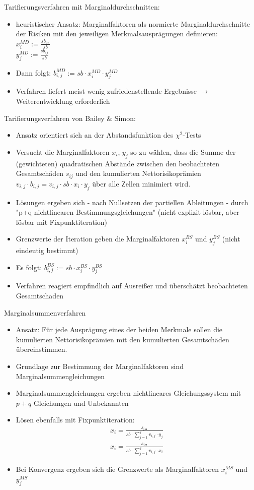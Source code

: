 \documentclass[12pt]{report}
\theoremstyle{dotless}
\theoremstyle{definition}
\begin{document}
Tarifierungsverfahren mit Marginaldurchschnitten:
\begin{itemize}
\item heuristischer Ansatz: Marginalfaktoren als normierte Marginaldurchschnitte der Risiken mit den jeweiligen Merkmalsausprägungen definieren:\\
$x_i^{MD} := \frac{sb_{i\circ}}{sb}$ \\
$y_j^{MD} := \frac{sb_{\circ j}}{sb}$ 
\item Dann folgt: $b_{i,j}^{MD} := sb \cdot x_i^{MD} \cdot y_j^{MD}$
\item Verfahren liefert meist wenig zufriedenstellende Ergebnisse $\rightarrow$ Weiterentwicklung erforderlich
\end{itemize}
Tarifierungsverfahren von Bailey $\&$ Simon:
\begin{itemize}
\item Ansatz orientiert sich an der Abstandsfunktion des $\chi^2$-Tests
\item Versucht die Marginalfaktoren $x_i$, $y_j$ so zu wählen, dass die Summe der (gewichteten) quadratischen Abstände zwischen den beobachteten Gesamtschäden $s_{ij}$ und den kumulierten Nettorisikoprämien $v_{i,j}\cdot b_{i,j} = v_{i,j}\cdot sb \cdot x_i \cdot y_j$ über alle Zellen minimiert wird.
\item Lösungen ergeben sich - nach Nullsetzen der partiellen Ableitungen - durch "p+q nichtlinearen Bestimmungsgleichungen" (nicht explizit lösbar, aber lösbar mit Fixpunktiteration)
\item Grenzwerte der Iteration geben die Marginalfaktoren $x_i^{BS}$ und $y_j^{BS}$ (nicht eindeutig bestimmt)
\item Es folgt: $b_{i,j}^{BS} := sb \cdot x_i^{BS} \cdot y_j^{BS}$
\item Verfahren reagiert empfindlich auf Ausreißer und überschätzt beobachteten Gesamtschaden
\end{itemize}
Marginalsummenverfahren
\begin{itemize}
\item Ansatz: Für jede Ausprägung eines der beiden Merkmale sollen die kumulierten Nettorisikoprämien mit den kumulierten Gesamtschäden übereinstimmen.
\item Grundlage zur Bestimmung der Marginalfaktoren sind Marginalsummengleichungen 
\item Marginalsummengleichungen ergeben nichtlineares Gleichungssystem mit $p+q$ Gleichungen und Unbekannten
\item Lösen ebenfalls mit Fixpunktiteration:
\begin{align}
x_i = \frac{s_{i\bullet }}{sb \cdot \sum_{j=1}^q v_{i,j} \cdot y_j} \\
x_i = \frac{s_{i \bullet}}{sb \cdot \sum_{j=1}^q v_{i,j} \cdot x_i}
\end{align}
\item Bei Konvergenz ergeben sich die Grenzwerte als Marginalfaktoren $x_i^{MS}$ und $y_j^{MS}$
\end{itemize}
\end{document}
